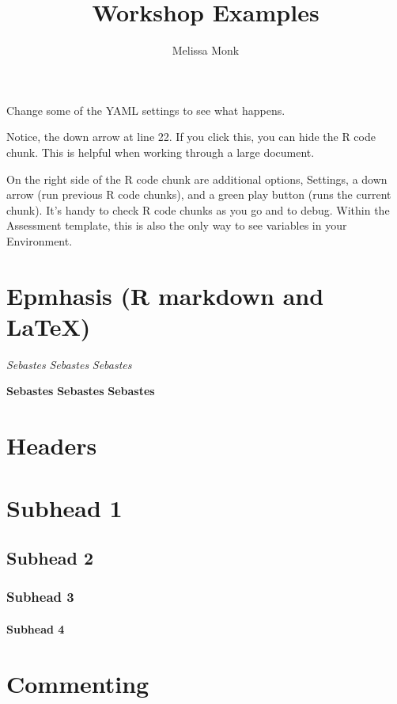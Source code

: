 \documentclass[12pt,]{article}
\title{Workshop Examples}
\author{Melissa Monk}
\date{}
\let\oldparagraph\paragraph
\renewcommand{\paragraph}[1]{\oldparagraph{#1}\mbox{}}
\begin{document}
\maketitle

{
\setcounter{tocdepth}{4}
\tableofcontents
}
Change some of the YAML settings to see what happens.

Notice, the down arrow at line 22. If you click this, you can hide the R
code chunk. This is helpful when working through a large document.

On the right side of the R code chunk are additional options, Settings,
a down arrow (run previous R code chunks), and a green play button (runs
the current chunk). It's handy to check R code chunks as you go and to
debug. Within the Assessment template, this is also the only way to see
variables in your Environment.

\section{Epmhasis (R markdown and
LaTeX)}\label{epmhasis-r-markdown-and-latex}

\emph{Sebastes} \emph{Sebastes} \emph{Sebastes}

\textbf{Sebastes} \textbf{Sebastes} \textbf{Sebastes}

\section{Headers}\label{headers}

\section{Subhead 1}\label{subhead-1}

\subsection{Subhead 2}\label{subhead-2}

\subsubsection{Subhead 3}\label{subhead-3}

\paragraph{Subhead 4}\label{subhead-4}

\section{Commenting}\label{commenting}
\end{document}
